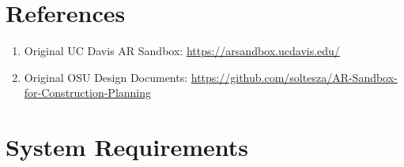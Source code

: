 \documentclass[letterpaper, 10pt, onecolumn, draftclsnofoot]{IEEEtran}
\begin{document}
    
\section{\textbf{References}}
    \begin{enumerate}[\label={}]         
        \item{Original UC Davis AR Sandbox: \url{https://arsandbox.ucdavis.edu/}}
        \item{Original OSU Design Documents: \url{https://github.com/soltesza/AR-Sandbox-for-Construction-Planning}}
    \end{enumerate}

\section{\textbf{System Requirements}}
\end{document}
